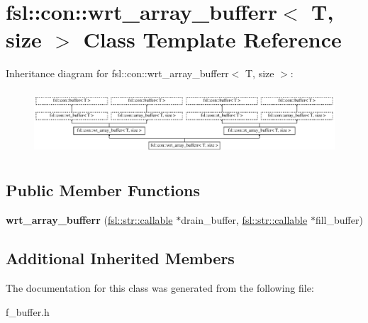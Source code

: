 \hypertarget{classfsl_1_1con_1_1wrt__array__bufferr}{}\section{fsl\+::con\+::wrt\+\_\+array\+\_\+bufferr$<$ T, size $>$ Class Template Reference}
\label{classfsl_1_1con_1_1wrt__array__bufferr}
Inheritance diagram for fsl\+::con\+::wrt\+\_\+array\+\_\+bufferr$<$ T, size $>$\+:\begin{figure}[H]
\begin{center}
\leavevmode
\includegraphics[height=2.445415cm]{classfsl_1_1con_1_1wrt__array__bufferr}
\end{center}
\end{figure}
\subsection*{Public Member Functions}
\begin{DoxyCompactItemize}
\item 
\mbox{\label{classfsl_1_1con_1_1wrt__array__bufferr_af3c8842fe5f484a0c30670c0fee4bc2f}} 
{\bfseries wrt\+\_\+array\+\_\+bufferr} (\mbox{\hyperlink{classfsl_1_1str_1_1callable}{fsl\+::str\+::callable}} $\ast$drain\+\_\+buffer, \mbox{\hyperlink{classfsl_1_1str_1_1callable}{fsl\+::str\+::callable}} $\ast$fill\+\_\+buffer)
\end{DoxyCompactItemize}
\subsection*{Additional Inherited Members}


The documentation for this class was generated from the following file\+:\begin{DoxyCompactItemize}
\item 
f\+\_\+buffer.\+h\end{DoxyCompactItemize}
